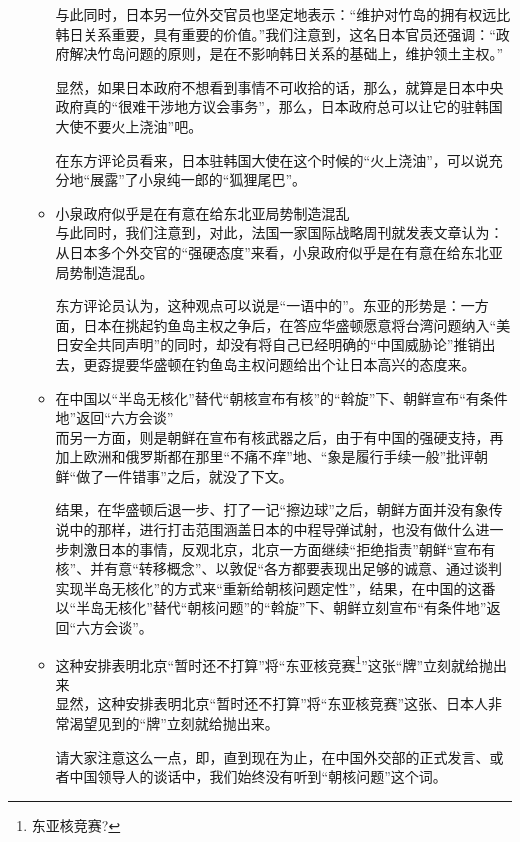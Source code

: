\documentclass[a4paper,11pt]{article}
\begin{document}
\begin{itemize}
\begin{itemize}
    与此同时，日本另一位外交官员也坚定地表示：“维护对竹岛的拥有权远比韩日关系重要，具有重要的价值。”我们注意到，这名日本官员还强调：“政府解决竹岛问题的原则，是在不影响韩日关系的基础上，维护领土主权。”

    显然，如果日本政府不想看到事情不可收拾的话，那么，就算是日本中央政府真的“很难干涉地方议会事务”，那么，日本政府总可以让它的驻韩国大使不要火上浇油”吧。

    在东方评论员看来，日本驻韩国大使在这个时候的“火上浇油”，可以说充分地“展露”了小泉纯一郎的“狐狸尾巴”。
 

\item 小泉政府似乎是在有意在给东北亚局势制造混乱\\
\label{sec-1_3_2}%
与此同时，我们注意到，对此，法国一家国际战略周刊就发表文章认为：从日本多个外交官的“强硬态度”来看，小泉政府似乎是在有意在给东北亚局势制造混乱。

    东方评论员认为，这种观点可以说是“一语中的”。东亚的形势是：一方面，日本在挑起钓鱼岛主权之争后，在答应华盛顿愿意将台湾问题纳入“美日安全共同声明”的同时，却没有将自己已经明确的“中国威胁论”推销出去，更孬提要华盛顿在钓鱼岛主权问题给出个让日本高兴的态度来。
 
 

\item 在中国以“半岛无核化”替代“朝核宣布有核”的“斡旋”下、朝鲜宣布“有条件地”返回“六方会谈”\\
\label{sec-1_3_3}%
而另一方面，则是朝鲜在宣布有核武器之后，由于有中国的强硬支持，再加上欧洲和俄罗斯都在那里“不痛不痒”地、“象是履行手续一般”批评朝鲜“做了一件错事”之后，就没了下文。

    结果，在华盛顿后退一步、打了一记“擦边球”之后，朝鲜方面并没有象传说中的那样，进行打击范围涵盖日本的中程导弹试射，也没有做什么进一步刺激日本的事情，反观北京，北京一方面继续“拒绝指责”朝鲜“宣布有核”、并有意“转移概念”、以敦促“各方都要表现出足够的诚意、通过谈判实现半岛无核化”的方式来“重新给朝核问题定性”，结果，在中国的这番以“半岛无核化”替代“朝核问题”的“斡旋”下、朝鲜立刻宣布“有条件地”返回“六方会谈”。
 
 

\item 这种安排表明北京“暂时还不打算”将“东亚核竞赛\protect\footnote{东亚核竞赛? }”这张“牌”立刻就给抛出来\\
\label{sec-1_3_4}%
显然，这种安排表明北京“暂时还不打算”将“东亚核竞赛”这张、日本人非常渴望见到的“牌”立刻就给抛出来。

    请大家注意这么一点，即，直到现在为止，在中国外交部的正式发言、或者中国领导人的谈话中，我们始终没有听到“朝核问题”这个词。


\end{itemize}
\end{itemize}
\end{document}
